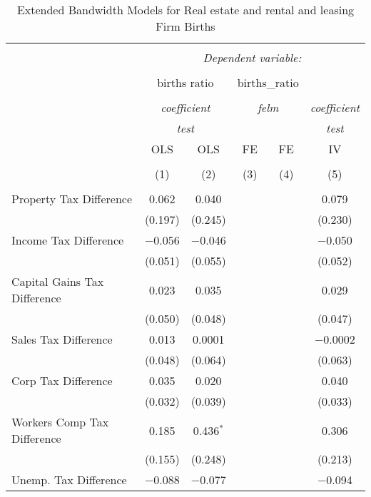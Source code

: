 
\begin{table}[!htbp] \centering 
  \caption{Extended Bandwidth Models for  Real estate and rental and leasing Firm Births} 
  \label{} 
\begin{tabular}{@{\extracolsep{5pt}}lccccc} 
\\[-1.8ex]\hline 
\hline \\[-1.8ex] 
 & \multicolumn{5}{c}{\textit{Dependent variable:}} \\ 
\cline{2-6} 
\\[-1.8ex] & \multicolumn{2}{c}{births ratio} & \multicolumn{2}{c}{births\_ratio} &   \\ 
\\[-1.8ex] & \multicolumn{2}{c}{\textit{coefficient}} & \multicolumn{2}{c}{\textit{felm}} & \textit{coefficient} \\ 
 & \multicolumn{2}{c}{\textit{test}} & \multicolumn{2}{c}{\textit{}} & \textit{test} \\ 
 & OLS & OLS & FE & FE & IV \\ 
\\[-1.8ex] & (1) & (2) & (3) & (4) & (5)\\ 
\hline \\[-1.8ex] 
 Property Tax Difference & 0.062 & 0.040 &  &  & 0.079 \\ 
  & (0.197) & (0.245) &  &  & (0.230) \\ 
  Income Tax Difference & $-$0.056 & $-$0.046 &  &  & $-$0.050 \\ 
  & (0.051) & (0.055) &  &  & (0.052) \\ 
  Capital Gains Tax Difference & 0.023 & 0.035 &  &  & 0.029 \\ 
  & (0.050) & (0.048) &  &  & (0.047) \\ 
  Sales Tax Difference & 0.013 & 0.0001 &  &  & $-$0.0002 \\ 
  & (0.048) & (0.064) &  &  & (0.063) \\ 
  Corp Tax Difference & 0.035 & 0.020 &  &  & 0.040 \\ 
  & (0.032) & (0.039) &  &  & (0.033) \\ 
  Workers Comp Tax Difference & 0.185 & 0.436$^{*}$ &  &  & 0.306 \\ 
  & (0.155) & (0.248) &  &  & (0.213) \\ 
  Unemp. Tax Difference & $-$0.088 & $-$0.077 &  &  & $-$0.094 \\ 

\end{tabular}
\end{table}
